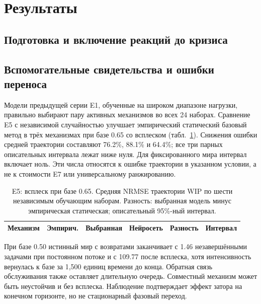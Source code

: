 \documentclass[runningheads]{llncs}
\begin{document}
\section{Результаты}
\subsection{Подготовка и включение реакций до кризиса}


\subsection{Вспомогательные свидетельства и ошибки переноса}
Модели предыдущей серии E1, обученные на широком диапазоне нагрузки, правильно выбирают пару активных механизмов во всех 24 наборах. Сравнение E5 с независимой случайностью улучшает эмпирический статический базовый метод в трёх механизмах при базе 0.65 со всплеском (табл.~\ref{tab:e5}). Снижения ошибки средней траектории составляют 76.2\%, 88.1\% и 64.4\%; все три парных описательных интервала лежат ниже нуля. Для фиксированного мира интервал включает ноль. Эти числа относятся к ошибке траектории в указанном условии, а не к стоимости E7 или универсальному ранжированию.
\begin{table}[t]
\caption{E5: всплеск при базе 0.65. Средняя NRMSE траектории WIP по шести независимым обучающим наборам. Разность: выбранная модель минус эмпирическая статическая; описательный 95\%-ный интервал.}\label{tab:e5}
\centering\small\setlength{\tabcolsep}{4pt}
\begin{tabular}{lrrrrl}\toprule
Механизм & Эмпирич. & Выбранная & Нейросеть & Разность & Интервал\\\midrule

\end{tabular}
\end{table}

При базе 0.50 истинный мир с возвратами заканчивает с 1.46 незавершёнными задачами при постоянном потоке и с 109.77 после всплеска, хотя интенсивность вернулась к базе за 1,500 единиц времени до конца. Обратная связь обслуживания также оставляет длительную очередь. Совместный механизм может быть неустойчив и без всплеска. Наблюдение подтверждает эффект затора на конечном горизонте, но не стационарный фазовый переход.
\end{document}
